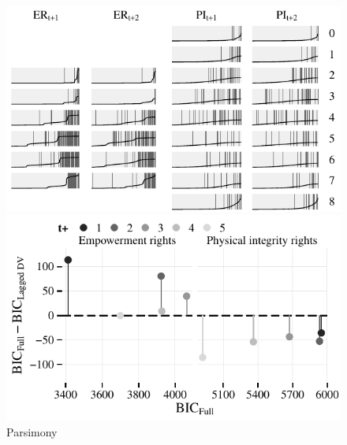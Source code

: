 \begin{figure}[h]
  \begin{minipage}[c]{.49\linewidth}
    \centering
    \includegraphics[width=\linewidth]{./sections/03replication/separation_revise.pdf}
    \caption{Predictive accuracy}
    \label{fig:sepPlot}
  \end{minipage}
  \hfill
  \begin{minipage}[c]{.49\linewidth}
    \centering
    \includegraphics[width=\linewidth]{./sections/03replication/bicDifferences.pdf}
    \caption{Parsimony}
    \label{fig:bicDifferences}
  \end{minipage}
\end{figure}

